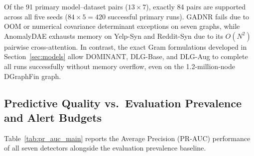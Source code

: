 \documentclass[applsci,article,submit,moreauthors,pdftex]{Definitions/mdpi}
\begin{document}
Of the 91 primary model--dataset pairs ($13 \times 7$), exactly 84 pairs are supported across all five seeds ($84 \times 5 = 420$ successful primary runs). GADNR fails due to OOM or numerical covariance determinant exceptions on seven graphs, while AnomalyDAE exhausts memory on Yelp-Syn and Reddit-Syn due to its $O(N^2)$ pairwise cross-attention. In contrast, the exact Gram formulations developed in Section~\ref{sec:models} allow DOMINANT, DLG-Base, and DLG-Aug to complete all runs successfully without memory overflow, even on the 1.2-million-node DGraphFin graph.

\subsection{Predictive Quality vs.\ Evaluation Prevalence and Alert Budgets}
Table~\ref{tab:pr_auc_main} reports the Average Precision (PR-AUC) performance of all seven detectors alongside the evaluation prevalence baseline.
\end{document}
